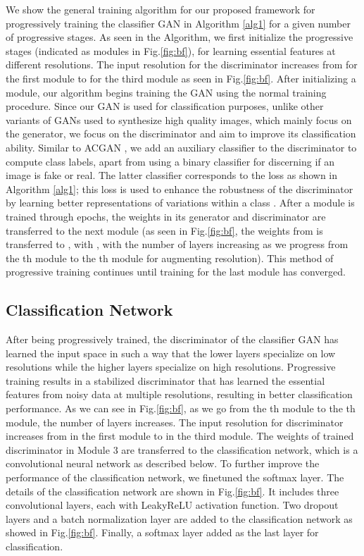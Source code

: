 \documentclass[runningheads]{llncs}
\begin{document}
We show the general  training algorithm for our proposed framework for progressively  training the classifier GAN   in Algorithm \ref{alg1} for a given number of progressive stages. As seen in the Algorithm, we first initialize the progressive stages (indicated as  modules in Fig.\ref{fig:bf}), for learning essential features at different resolutions. The input resolution for  the discriminator increases from  for the first module   to  for the third module as seen in  Fig.\ref{fig:bf}. After initializing a  module, our algorithm begins training the GAN using the  normal training procedure. Since our GAN is used for classification purposes, unlike other variants of GANs used to synthesize high quality images, which mainly focus on  the generator,  we  focus on the  discriminator and aim to improve its classification ability. Similar to  ACGAN \cite{google},  we add an auxiliary classifier  to  the discriminator to compute class labels, apart from  using a  binary classifier   for discerning if an image is fake or real. The latter classifier corresponds to the loss  as shown in Algorithm \ref{alg1}; this loss is used to enhance the robustness of the discriminator by learning better representations of variations within a class \cite{hariharan2017low}. After a module is trained through epochs, the weights in its generator and discriminator are transferred to the next module (as seen in Fig.\ref{fig:bf}, the weights from  is transferred to  , with , with the number of layers increasing as we progress from the th module to the th module for augmenting resolution). This method of progressive training continues until training for the last module has converged.

\subsection{Classification Network}\label{class}
After being progressively trained, the discriminator of the classifier GAN  has learned   the input space in such a way that the lower layers specialize on low resolutions while the higher layers specialize on high resolutions.   Progressive training results in a stabilized  discriminator that has  learned the essential features from noisy data at multiple resolutions, resulting in better classification performance. As we can see in Fig.\ref{fig:bf},  as we go from the th module to the th module, the number of layers increases. The input resolution  for discriminator increases from  in the first module to  in the third module.  The  weights of trained discriminator  in Module 3 are transferred to the  classification network, which is a convolutional neural network as described below.    To further improve the performance of the classification network, we finetuned the softmax layer. 
The details of the  classification network are shown  in Fig.\ref{fig:bf}. It includes three convolutional layers,  each  with LeakyReLU activation function.   Two dropout layers and a batch normalization layer are added to the classification network as showed in Fig.\ref{fig:bf}. Finally, a softmax layer added as the last layer for classification.
\end{document}

